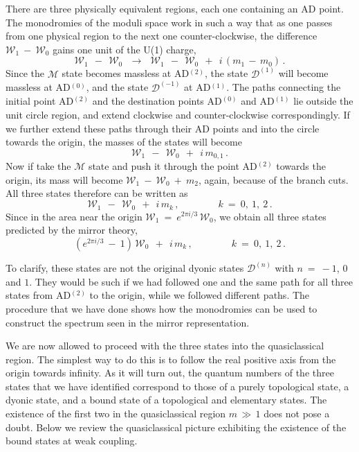 \documentclass[epsfig,12pt]{article}
\def\beq{\begin{equation}}
\def\eeq{\end{equation}}
\def\beq{\begin{equation}}
\def\eeq{\end{equation}}
\newcommand{\W}{\mathcal{W}}
\newcommand{\M}{\mathcal{M}}
\newcommand{\D}{\mathcal{D}}
\begin{document}
	There are three physically equivalent regions, each one containing an AD point.
	The monodromies of the moduli space work in such a way that as one passes from 
	one physical region to the next one counter-clockwise, the difference 
$ \W_1 ~-~ \W_0 $
	gains one unit of the U(1) charge,
\beq
	\W_1 ~~-~~ \W_0  ~~~\to~~~ \W_1 ~~-~~ \W_0 ~~+~~ i\,( m_1 \,-\, m_0 ) \,.
\eeq
	Since the $ \M $ state becomes massless at AD$^{(2)}$, the state $ \D^{(1)} $ will become
	massless at AD$^{(0)}$, and the state $ \D^{(-1)} $ at AD$^{(1)}$.
	The paths connecting the initial point AD$^{(2)}$ and the destination points AD$^{(0)}$ and AD$^{(1)}$
	lie outside the unit circle region, and 
	extend clockwise and counter-clockwise correspondingly.
	If we further extend these paths through their AD points and into the circle towards the origin,
	the masses of the states will become
\beq
	\W_1 ~~-~~ \W_0 ~~+~~ i\, m_{0,1}\,.
\eeq
	Now if take the $ \M $ state and push it through the point AD$^{(2)}$ towards the origin,
	its mass will become $ \W_1 ~-~ \W_0 ~+~ m_2 $, again, because of the branch cuts.
	All three states therefore can be written as
\beq
	\W_1 ~~-~~ \W_0 ~~+~~ i\, m_k\,,\qquad\qquad k~=~ 0,~1,~2\,.
\eeq
	Since in the area near the origin $ \W_1 ~=~ e^{2 \pi i / 3}\, \W_0 $, we obtain all three states 
	predicted by the mirror theory,
\beq
	(e^{2 \pi i /3} ~-~ 1)\, \W_0 ~~+~~ i\, m_k\,,\qquad\qquad k~=~ 0,~1,~2\,.
\eeq

	To clarify, these states are not the original dyonic states $ \D^{(n)} $ with $ n ~=~ -1 $,
	$ 0 $ and $ 1 $.
	They would be such if we had followed one and the same path for all three states from AD$^{(2)}$ to
	the origin, while we followed different paths.
	The procedure that we have done shows how the monodromies can be used to construct the spectrum
	seen in the mirror representation.

	We are now allowed to proceed with the three states into the quasiclassical region.
	The simplest way to do this is to follow the real positive axis from the origin towards infinity.
	As it will turn out, the quantum numbers of the three states that we have identified correspond to those
	of a purely topological state, a dyonic state, and a bound state of a topological and elementary states.
	The existence of the first two in the quasiclassical region $ m \,\gg\, 1 $ does not pose a doubt.
	Below we review the quasiclassical picture exhibiting the existence of the bound states at weak coupling.


\newpage
\end{document}

